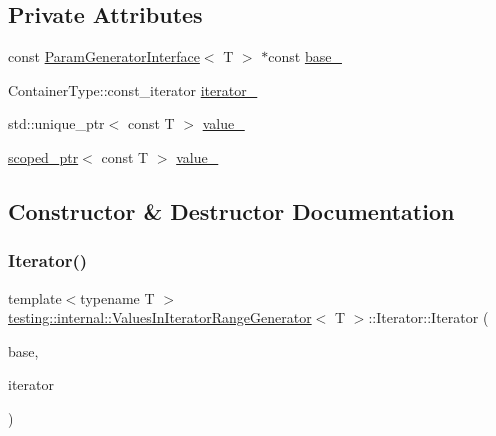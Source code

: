 \subsection*{Private Attributes}
\begin{DoxyCompactItemize}
\item 
const \mbox{\hyperlink{classtesting_1_1internal_1_1_param_generator_interface}{Param\+Generator\+Interface}}$<$ T $>$ $\ast$const \mbox{\hyperlink{classtesting_1_1internal_1_1_values_in_iterator_range_generator_1_1_iterator_a7ffcea3ceffb176289f059349042e31a}{base\+\_\+}}
\item 
Container\+Type\+::const\+\_\+iterator \mbox{\hyperlink{classtesting_1_1internal_1_1_values_in_iterator_range_generator_1_1_iterator_aaff15b9f8addac71b91c32053bf9ea1e}{iterator\+\_\+}}
\item 
std\+::unique\+\_\+ptr$<$ const T $>$ \mbox{\hyperlink{classtesting_1_1internal_1_1_values_in_iterator_range_generator_1_1_iterator_ac173c404aa7250d32297e56750c784c1}{value\+\_\+}}
\item 
\mbox{\hyperlink{classtesting_1_1internal_1_1scoped__ptr}{scoped\+\_\+ptr}}$<$ const T $>$ \mbox{\hyperlink{classtesting_1_1internal_1_1_values_in_iterator_range_generator_1_1_iterator_a57e4f5d7ad1d15f38089513198c305f0}{value\+\_\+}}
\end{DoxyCompactItemize}


\subsection{Constructor \& Destructor Documentation}
\mbox{\label{classtesting_1_1internal_1_1_values_in_iterator_range_generator_1_1_iterator_aebd635efe7082e6fc45bb8ae0dbefd2e}} 
\subsubsection{\texorpdfstring{Iterator()}{Iterator()}\hspace{0.1cm}{\footnotesize\ttfamily [1/6]}}
{\footnotesize\ttfamily template$<$typename T $>$ \\
\mbox{\hyperlink{classtesting_1_1internal_1_1_values_in_iterator_range_generator}{testing\+::internal\+::\+Values\+In\+Iterator\+Range\+Generator}}$<$ T $>$\+::Iterator\+::\+Iterator (\begin{DoxyParamCaption}\item[{const \mbox{\hyperlink{classtesting_1_1internal_1_1_param_generator_interface}{Param\+Generator\+Interface}}$<$ T $>$ $\ast$}]{base,  }\item[{typename Container\+Type\+::const\+\_\+iterator}]{iterator }\end{DoxyParamCaption})\hspace{0.3cm}{\ttfamily [inline]}}

